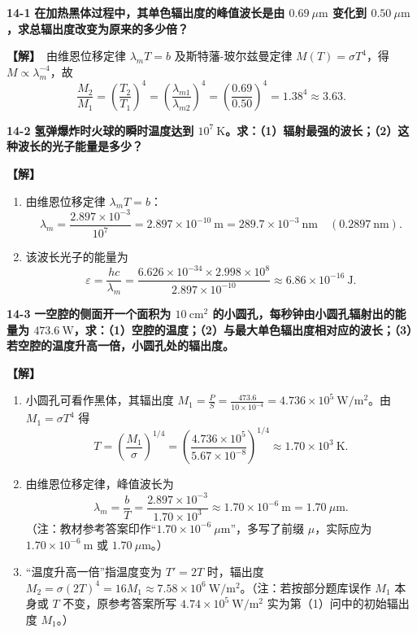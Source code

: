 \documentclass[zihao=5,a4paper,UTF8]{ctexart}
\newenvironment{prob}[2]{%
    \par\vspace{6pt}\noindent\textbf{\color{navy}#1} \textbf{#2}\par\nopagebreak\vspace{2pt}%
}{%
    \par\vspace{4pt}%
}
\newcommand{\sol}{\noindent\textbf{\color{tealaccent}【解】}\ }
\begin{document}
\begin{prob}{14-1}{在加热黑体过程中，其单色辐出度的峰值波长是由 $0.69\ \mu\mathrm{m}$ 变化到 $0.50\ \mu\mathrm{m}$，求总辐出度改变为原来的多少倍？}
\sol 由维恩位移定律 $\lambda_m T = b$ 及斯特藩-玻尔兹曼定律 $M(T) = \sigma T^4$，得 $M \propto \lambda_m^{-4}$，故
\[
    \frac{M_2}{M_1} = \left(\frac{T_2}{T_1}\right)^4 = \left(\frac{\lambda_{m1}}{\lambda_{m2}}\right)^4 = \left(\frac{0.69}{0.50}\right)^4 = 1.38^4 \approx 3.63.
\]
\end{prob}

\begin{prob}{14-2}{氢弹爆炸时火球的瞬时温度达到 $10^7\ \mathrm{K}$。求：（1）辐射最强的波长；（2）这种波长的光子能量是多少？}
\sol
\begin{enumerate}[leftmargin=2em, itemsep=2pt]
    \item 由维恩位移定律 $\lambda_m T = b$：
    \[
        \lambda_m = \frac{2.897\times 10^{-3}}{10^7} = 2.897\times 10^{-10}\ \mathrm{m} = 289.7\times 10^{-3}\ \mathrm{nm}\quad (0.2897\ \mathrm{nm}).
    \]
    \item 该波长光子的能量为
    \[
        \varepsilon = \frac{hc}{\lambda_m} = \frac{6.626\times 10^{-34}\times 2.998\times 10^8}{2.897\times 10^{-10}} \approx 6.86\times 10^{-16}\ \mathrm{J}.
    \]
\end{enumerate}
\end{prob}

\begin{prob}{14-3}{一空腔的侧面开一个面积为 $10\ \mathrm{cm^2}$ 的小圆孔，每秒钟由小圆孔辐射出的能量为 $473.6\ \mathrm{W}$，求：（1）空腔的温度；（2）与最大单色辐出度相对应的波长；（3）若空腔的温度升高一倍，小圆孔处的辐出度。}
\sol
\begin{enumerate}[leftmargin=2em, itemsep=2pt]
    \item 小圆孔可看作黑体，其辐出度 $M_1 = \frac{P}{S} = \frac{473.6}{10\times 10^{-4}} = 4.736\times 10^5\ \mathrm{W/m^2}$。由 $M_1 = \sigma T^4$ 得
    \[
        T = \left(\frac{M_1}{\sigma}\right)^{1/4} = \left(\frac{4.736\times 10^5}{5.67\times 10^{-8}}\right)^{1/4} \approx 1.70\times 10^3\ \mathrm{K}.
    \]
    \item 由维恩位移定律，峰值波长为
    \[
        \lambda_m = \frac{b}{T} = \frac{2.897\times 10^{-3}}{1.70\times 10^3} \approx 1.70\times 10^{-6}\ \mathrm{m} = 1.70\ \mu\mathrm{m}.
    \]
    （注：教材参考答案印作“$1.70\times 10^{-6}\ \mu\mathrm{m}$”，多写了前缀 $\mu$，实际应为 $1.70\times 10^{-6}\ \mathrm{m}$ 或 $1.70\ \mu\mathrm{m}$。）
    \item “温度升高一倍”指温度变为 $T' = 2T$ 时，辐出度 $M_2 = \sigma (2T)^4 = 16M_1 \approx 7.58\times 10^6\ \mathrm{W/m^2}$。（注：若按部分题库误作 $M_1$ 本身或 $T$ 不变，原参考答案所写 $4.74\times 10^5\ \mathrm{W/m^2}$ 实为第（1）问中的初始辐出度 $M_1$。）
\end{enumerate}
\end{prob}
\end{document}
